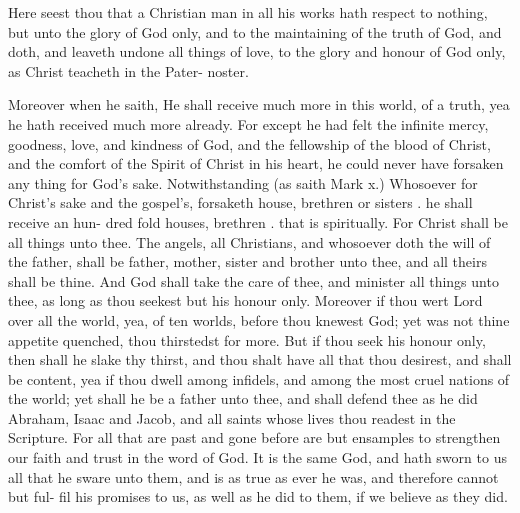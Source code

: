 \documentclass{article}
\begin{document}
Here seest thou that a Christian man in all his works 
hath respect to nothing, but unto the glory of God only, 
and to the maintaining of the truth of God, and doth, 
and leaveth undone all things of love, to the glory and 
honour of God only, as Christ teacheth in the Pater- 
noster. 

Moreover when he saith, He shall receive much more 
in this world, of a truth, yea he hath received much more 
already. For except he had felt the infinite mercy, 
goodness, love, and kindness of God, and the fellowship 
of the blood of Christ, and the comfort of the Spirit of 
Christ in his heart, he could never have forsaken any thing 
for God's sake. Notwithstanding (as saith Mark x.) 
Whosoever for Christ's sake and the gospel's, forsaketh 
house, brethren or sisters \ampc. he shall receive an hun- 
dred fold houses, brethren \ampc. that is spiritually. For 
Christ shall be all things unto thee. The angels, all 
Christians, and whosoever doth the will of the father, 
shall be father, mother, sister and brother unto thee, and 
all theirs shall be thine. And God shall take the care of 
thee, and minister all things unto thee, as long as thou 
seekest but his honour only. Moreover if thou wert 
Lord over all the world, yea, of ten worlds, before thou 
knewest God; yet was not thine appetite quenched, thou 
thirstedst for more. But if thou seek his honour only, 
then shall he slake thy thirst, and thou shalt have all that 
thou desirest, and shall be content, yea if thou dwell 
among infidels, and among the most cruel nations of 
the world; yet shall he be a father unto thee, and shall 
defend thee as he did Abraham, Isaac and Jacob, and all 
saints whose lives thou readest in the Scripture. For all 
that are past and gone before are but ensamples to strengthen 
our faith and trust in the word of God. It is the same 
God, and hath sworn to us all that he sware unto them, 
and is as true as ever he was, and therefore cannot but ful- 
fil his promises to us, as well as he did to them, if we 
believe as they did. 
\end{document}
